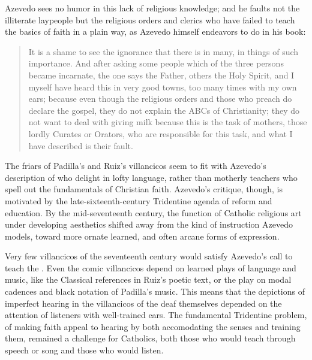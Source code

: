 Azevedo sees no humor in this lack of religious knowledge; and he faults not the illiterate laypeople but the religious orders and clerics who have failed to teach the basics of faith in a plain way, as Azevedo himself endeavors to do in his book:
\begin{quote}
It is a shame to see the ignorance that there is in many, in things of such importance.
And after asking some people which of the three persons became incarnate, the one says the Father, others the Holy Spirit, and I myself have heard this in very good towns, too many times with my own ears;
because even though the religious orders and those who preach do declare the gospel, 
they do not explain the ABCs  of Christianity;
they do not want to deal with giving milk because this is the task of mothers, those lordly Curates or Orators, who are responsible for this task, and what I have described is their fault.%
  \begin{Footnote}
  \Autocite[27]{Azevedo:Catecismo}
  \end{Footnote}
\end{quote}

The friars of Padilla's and Ruiz's villancicos seem to fit with Azevedo's description of  who delight in lofty language, rather than motherly teachers who spell out the fundamentals of Christian faith.
Azevedo's critique, though, is motivated by the late-sixteenth-century Tridentine agenda of reform and education.
By the mid-seventeenth century, the function of Catholic religious art under developing  aesthetics shifted away from the kind of  instruction Azevedo models, toward more ornate learned, and often arcane forms of expression.

Very few villancicos of the seventeenth century would satisfy Azevedo's call to teach the .
Even the comic villancicos depend on learned plays of language and music, like the Classical references in Ruiz's poetic text, or the play on modal cadences and black notation of Padilla's music.
This means that the depictions of imperfect hearing in the villancicos of the deaf themselves depended on the attention of listeners with well-trained ears.
The fundamental Tridentine problem, of making faith appeal to hearing by both accomodating the senses and training them, remained a challenge for Catholics, both those who would teach through speech or song and those who would listen.




